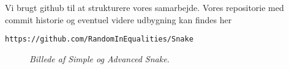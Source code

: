 Vi brugt github til at strukturere vores samarbejde. Vores repositorie med commit historie og eventuel videre udbygning kan findes her
\begin{center}
\texttt{https://github.com/RandomInEqualities/Snake}
\end{center}

\begin{figure}
	\centering
	\hspace{0.1\textwidth}
	\caption{\textit{Billede af Simple og Advanced Snake.}}
\end{figure}